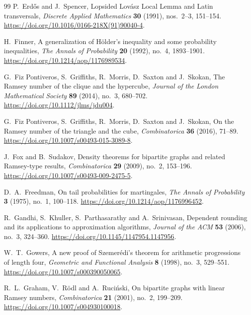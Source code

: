 \begin{thebibliography}{99}
P.~Erd\H{o}s and J.~Spencer,
Lopsided Lov\'asz Local Lemma and Latin transversals,
\emph{Discrete Applied Mathematics} \textbf{30} (1991),
nos.~2--3, 151--154.
\url{https://doi.org/10.1016/0166-218X(91)90040-4}.

H.~Finner,
A generalization of H\"older's inequality and some probability inequalities,
\emph{The Annals of Probability} \textbf{20} (1992), no.~4, 1893--1901.
\url{https://doi.org/10.1214/aop/1176989534}.

G.~Fiz Pontiveros, S.~Griffiths, R.~Morris, D.~Saxton and J.~Skokan,
The Ramsey number of the clique and the hypercube,
\emph{Journal of the London Mathematical Society}
\textbf{89} (2014), no.~3, 680--702.
\url{https://doi.org/10.1112/jlms/jdu004}.

G.~Fiz Pontiveros, S.~Griffiths, R.~Morris, D.~Saxton and J.~Skokan,
On the Ramsey number of the triangle and the cube,
\emph{Combinatorica} \textbf{36} (2016), 71--89.
\url{https://doi.org/10.1007/s00493-015-3089-8}.

J.~Fox and B.~Sudakov,
Density theorems for bipartite graphs and related Ramsey-type results,
\emph{Combinatorica} \textbf{29} (2009), no.~2, 153--196.
\url{https://doi.org/10.1007/s00493-009-2475-5}.

D.~A.~Freedman,
On tail probabilities for martingales,
\emph{The Annals of Probability} \textbf{3} (1975), no.~1, 100--118.
\url{https://doi.org/10.1214/aop/1176996452}.

R.~Gandhi, S.~Khuller, S.~Parthasarathy and A.~Srinivasan,
Dependent rounding and its applications to approximation algorithms,
\emph{Journal of the ACM} \textbf{53} (2006), no.~3, 324--360.
\url{https://doi.org/10.1145/1147954.1147956}.

W.~T.~Gowers,
A new proof of Szemer\'edi's theorem for arithmetic progressions of length four,
\emph{Geometric and Functional Analysis} \textbf{8} (1998), no.~3, 529--551.
\url{https://doi.org/10.1007/s000390050065}.

R.~L.~Graham, V.~R\"odl and A.~Ruci\'nski,
On bipartite graphs with linear Ramsey numbers,
\emph{Combinatorica} \textbf{21} (2001), no.~2, 199--209.
\url{https://doi.org/10.1007/s004930100018}.


\end{thebibliography}
